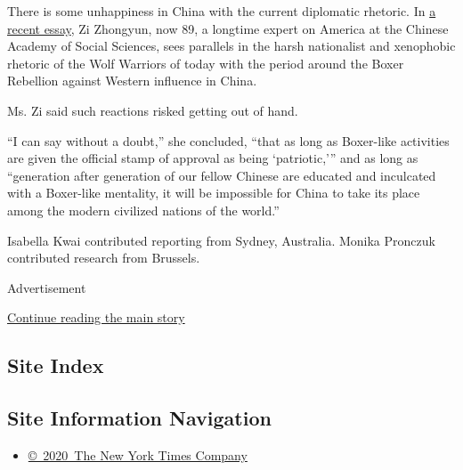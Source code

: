 There is some unhappiness in China with the current diplomatic rhetoric.
In
\href{http://chinaheritage.net/journal/1900-2020-an-old-anxiety-in-a-new-era/}{a
recent essay}, Zi Zhongyun, now 89, a longtime expert on America at the
Chinese Academy of Social Sciences, sees parallels in the harsh
nationalist and xenophobic rhetoric of the Wolf Warriors of today with
the period around the Boxer Rebellion against Western influence in
China.

Ms. Zi said such reactions risked getting out of hand.

``I can say without a doubt,'' she concluded, ``that as long as
Boxer-like activities are given the official stamp of approval as being
`patriotic,''' and as long as ``generation after generation of our
fellow Chinese are educated and inculcated with a Boxer-like mentality,
it will be impossible for China to take its place among the modern
civilized nations of the world.''

Isabella Kwai contributed reporting from Sydney, Australia. Monika
Pronczuk contributed research from Brussels.

Advertisement

\protect\hyperlink{after-bottom}{Continue reading the main story}

\hypertarget{site-index}{%
\subsection{Site Index}\label{site-index}}

\hypertarget{site-information-navigation}{%
\subsection{Site Information
Navigation}\label{site-information-navigation}}

\begin{itemize}
\tightlist
\item
  \href{https://help.nytimes3xbfgragh.onion/hc/en-us/articles/115014792127-Copyright-notice}{©~2020~The
  New York Times Company}
\end{itemize}

